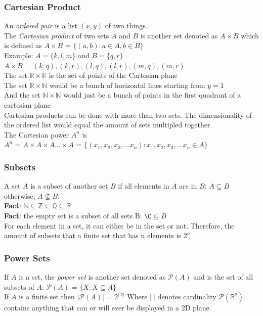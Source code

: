 \documentclass[a4paper,11pt]{article}
\begin{document}
\subsubsection{Cartesian Product}
An \textit{ordered pair} is a list $(x, y)$ of two things.\\
The \textit{Cartesian product} of two sets $A$ and $B$ is another set denoted as $A \times B$ which is defined as $A \times B$ = $\{(a, b):a\in A, b\in B\}$\\
Example: $A=\{k,l,m\}$ and $B=\{q,r\}$\\
$A \times B$ = ${(k,q),(k,r),(l,q),(l, r),(m, q),(m,r)}$\vspace{5pt}\\
The set $\mathbb R \times \mathbb R$ is the set of points of the Cartesian plane\\
The set $\mathbb R \times \mathbb N$ would be a bunch of horizontal lines starting from $y=1$\\
And the set $\mathbb N \times \mathbb N$ would just be a bunch of points in the first quadrant of a cartesian plane\vspace{5pt}\\
Cartesian products can be done with more than two sets. The dimensionality of the ordered list would equal the amount of sets multipled together.\vspace{5pt}\\
The Cartesian power $A^n$ is\\ $A^n$ = $A \times A \times A \dots \times A$ = $\{(x_1, x_2, x_3, \dots x_n):x_1,x_2,x_3, \dots x_n \in A\}$
\subsubsection{Subsets}
A set $A$ is a subset of another set $B$ if all elements in $A$ are in $B$: $A \subseteq B$ otherwise, $A \nsubseteq B$.\\
\textbf{Fact}: $\mathbb N \subseteq \mathbb Z \subseteq \mathbb Q \subseteq \mathbb R$\\
\textbf{Fact}: the empty set is a subset of all sets B: $\O \subseteq B$\vspace{5pt}\\
For each element in a set, it can either be in the set or not. Therefore, the amount of subsets that a finite set that has $n$ elements is $2^n$
\subsubsection{Power Sets}
If $A$ is a set, the \textit{power set} is another set denoted as $\mathscr{P}(A)$ and is the set of all subsets of $A$: $\mathscr{P}(A)$ = $\{X: X \subseteq A\}$\vspace{5pt}\\
If $A$ is a finite set then $|\mathscr{P}(A)|$ = $2^{|A|}$ Where $|~|$ denotes cardinality\vspace{5pt}
$\mathscr{P}(\mathbb{R}^{2})$ contains anything that can or will ever be displayed in a 2D plane.
\end{document}
